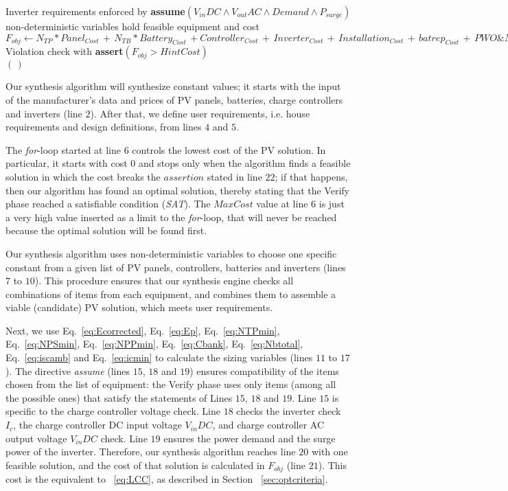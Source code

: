 \begin{algorithm}
\begin{algorithmic}[1]
	\STATE Inverter requirements enforced by \textbf{assume}$(V_{in}DC \wedge V_{out}AC \wedge Demand \wedge P_{surge})$ \\
	\STATE non-deterministic variables hold feasible equipment and cost  \\
	\STATE $F_{obj} \leftarrow  N_{TP}*Panel_{Cost} \, + \, N_{TB}*Battery_{Cost} \, + Controller_{Cost} \, + \, Inverter_{Cost} \, + \, Installation_{Cost} \, + \, batrep_{Cost} \, + \, PWO\&M_{Cost}$ \\
	\STATE Violation check with \textbf{assert}$(F_{obj} > HintCost)$ \\
  \ENDFOR
 \RETURN $(\,)$ 
 \end{algorithmic} 
 \label{alg:opt-algorithm}
 \end{algorithm}

Our synthesis algorithm will synthesize constant values; 
it starts with the input of the manufacturer's data and prices of PV panels, batteries, charge controllers and inverters (line $2$). After that, we define user requirements, i.e. house requirements and design definitions, from lines $4$ and $5$. 

The \textit{for}-loop started at line $6$ controls the lowest cost of the PV solution. In particular, it starts with cost $0$ and stops only when the algorithm finds a feasible solution in which the cost breaks the $assertion$ stated in line $22$; if that happens, then our algorithm has found an optimal solution, thereby stating that the {\sc Verify} phase reached a satisfiable condition (\textit{SAT}). The $MaxCost$ value at line $6$ is just a very high value inserted as a limit to the \textit{for}-loop, that will never be reached because the optimal solution will be found first.

Our synthesis algorithm uses non-deterministic variables to choose one specific constant from a given list of PV panels, controllers, batteries and inverters (lines $7$ to $10$). This procedure ensures that our synthesis engine checks all combinations of items from each equipment, and combines them to assemble a viable (candidate) PV solution, which meets user requirements.

Next, we use Eq.~\eqref{eq:Ecorrected}, Eq.~\eqref{eq:Ep}, Eq.~\eqref{eq:NTPmin}, Eq.~\eqref{eq:NPSmin}, Eq.~\eqref{eq:NPPmin}, Eq.~\eqref{eq:Cbank}, Eq.~\eqref{eq:Nbtotal}, Eq.~\eqref{eq:iscamb} and Eq.~\eqref{eq:icmin} to calculate the sizing variables (lines $11$ to $17$). The directive \textit{assume} (lines $15$, $18$ and $19$) 
ensures compatibility of the items chosen from the list of equipment: the {\sc Verify} phase uses only items (among all the possible ones) that satisfy the statements of Lines $15$, $18$ and $19$. Line $15$ is specific to the charge controller voltage check. Line $18$ checks the inverter check $I_{c}$, the charge controller DC input voltage $V_{in}DC$, and charge controller AC output voltage $V_{in}DC$ check. Line $19$ ensures the power demand and the surge power of the inverter.
Therefore, our synthesis algorithm reaches line $20$ with one feasible solution, and the cost of that solution is calculated in $F_{obj}$ (line $21$). This cost is the equivalent to ~\ref{eq:LCC}, as described in Section ~\ref{sec:optcriteria}.

